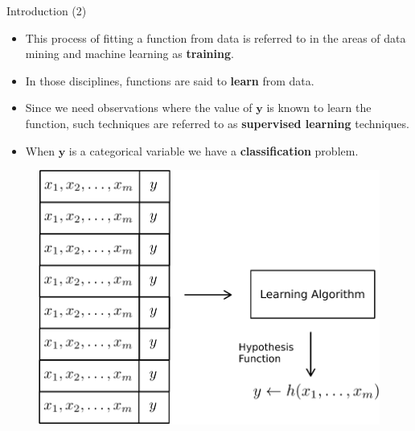\documentclass[handout]{beamer}
\begin{document}
\begin{frame}{Introduction (2)}
\scriptsize{
\begin{itemize}
 
 \item This process of fitting a function from data is referred to in the areas of data mining and machine learning as \textbf{training}.

 \item In those disciplines, functions are said to \textbf{learn} from data.
 
 \item Since we need observations where the value of $\mathbf{y}$ is known to learn the function, such techniques are referred to as \textbf{supervised learning} techniques.
 
 \item When $\mathbf{y}$ is a categorical variable we have a \textbf{classification} problem. 
 

 
\end{itemize}


\begin{figure}[h!]
  \centering
  \includegraphics[scale=0.4]{pics/learning.pdf}
\end{figure}

} 
 
\end{frame}
\end{document}
